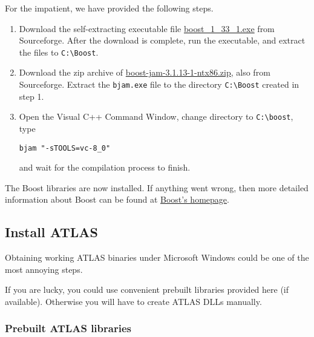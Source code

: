 \documentclass{article}
\begin{document}
For the impatient, we have provided the following steps.
%
\begin{enumerate}
\item Download the self-extracting executable file
\href{http://prdownloads.sourceforge.net/boost/boost_1_33_1.exe?download}
{boost_1_33_1.exe} from Sourceforge. 
After the download is complete, run the
executable, and extract the files to \texttt{C:\textbackslash Boost}.

\item Download the zip archive of 
\href{http://prdownloads.sourceforge.net/boost/boost-jam-3.1.13-1-ntx86.zip?download}
{boost-jam-3.1.13-1-ntx86.zip}, also from Sourceforge. 
Extract the \texttt{bjam.exe} file to the directory \texttt{C:\textbackslash Boost} created in step 1.

\item Open the Visual C++ Command Window, change directory to \texttt{C:\textbackslash boost}, 
type
\begin{verbatim}
bjam "-sTOOLS=vc-8_0"
\end{verbatim}
and wait for the compilation process to finish.

\end{enumerate}
%
The Boost libraries are now installed. If anything went wrong, then more detailed information about 
Boost can be found at  \href{http://www.boost.org/}{Boost's homepage}.

% 


\subsection{Install ATLAS}

Obtaining working ATLAS binaries under Microsoft Windows could be one of the
most annoying steps. 

If you are lucky, you could use 
convenient prebuilt libraries provided here (if available). Otherwise 
you will have to create ATLAS DLLs
manually. 

\subsubsection{Prebuilt ATLAS libraries}
\end{document}
